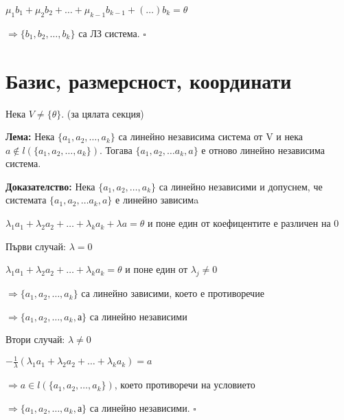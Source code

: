 \documentclass[fleqn,12pt]{article}
\begin{document}
\begin{flushleft}
$ \mu_1 b_1 + \mu_2 b_2 + \dots + \mu_{k-1} b_{k-1} + (\dots) b_k = \theta $

$ \Rightarrow \{ b_1, b_2, \dots, b_k \} $ са ЛЗ система. $\square$


\section{Базис, размерсност, координати}
    Нека $ V \neq \{ \theta \} $. (за цялата секция)
    
    \vspace{5mm}
    
    \textbf{Лема:} Нека $\{a_1, a_2, \dots, a_k\}$ са линейно независима система от V и нека $ a \notin l(\{ a_1, a_2, \dots, a_k\}) $. Тогава $ \{a_1, a_2, \dots a_k, a \} $ е отново линейно независима система.

    \vspace{5mm}
    
    \textbf{Доказателство:} Нека $\{a_1, a_2, \dots, a_k\} $ са линейно независими и допуснем, че системата $ \{a_1, a_2, \dots a_k, a \} $ е линейно зависимa

    \vspace{5mm}
    
    $ \lambda_1 a_1 + \lambda_2 a_2 + \dots + \lambda_k a_k + \lambda a = \theta $ и поне един от коефицентите е различен на 0

    \vspace{5mm}
    
    Първи случай: $\lambda = 0 $

    $ \lambda_1 a_1 + \lambda_2 a_2 + \dots + \lambda_k a_k = \theta $ и поне един от $\lambda_j \neq 0 $

    $ \Rightarrow \{a_1, a_2, \dots, a_k\} $ са линейно зависими, което е противоречие
    
    $ \Rightarrow \{a_1, a_2, \dots, a_k, а\} $ са линейно независими

    \vspace{5mm}
    
    Втори случай: $\lambda \neq 0 $

    $ - \frac{1}{\lambda} ( \lambda_1 a_1 + \lambda_2 a_2 + \dots + \lambda_k a_k ) = a $ 

    $ \Rightarrow a \in l(\{a_1, a_2, \dots, a_k\}) $, което противоречи на условието
    
    $ \Rightarrow \{a_1, a_2, \dots, a_k, а\} $ са линейно независими. $\square$

    
    \vspace{5mm}
    

\end{flushleft}
\end{document}
